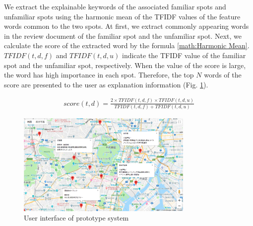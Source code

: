 \documentclass[journal]{IAENGtran}
\begin{document}

We extract the explainable keywords of the associated familiar spots and unfamiliar spots using the harmonic mean of the TFIDF values ​​of the feature words common to the two spots.
At first, we extract commonly appearing words in the review document of the familiar spot and the unfamiliar spot.
Next, we calculate the score of the extracted word by the formula \ref{math:Harmonic Mean}.
$TFIDF(t,d,f)$ and $TFIDF(t,d,u)$ indicate the TFIDF value of the familiar spot and the unfamiliar spot, respectively.
When the value of the score is large, the word has high importance in each spot.
Therefore, the top $N$ words of the score are presented to the user as explanation information (Fig. \ref{fig:photo_map}).

\begin{eqnarray}
  score(t,d) = \frac{2 \times TFIDF(t,d,f) \times TFIDF(t,d,u)}{TFIDF(t,d,f) + TFIDF(t,d,u)}
  \label{math:Harmonic Mean}
\end{eqnarray}

\begin{figure}[t]
  \begin{center}
    \includegraphics[clip,width=8.5cm,bb=0 0 1289 750]{picture/Photo_Map.png}
    \caption{User interface of prototype system}
    \label{fig:photo_map}
   \end{center}
\end{figure}
\end{document}

